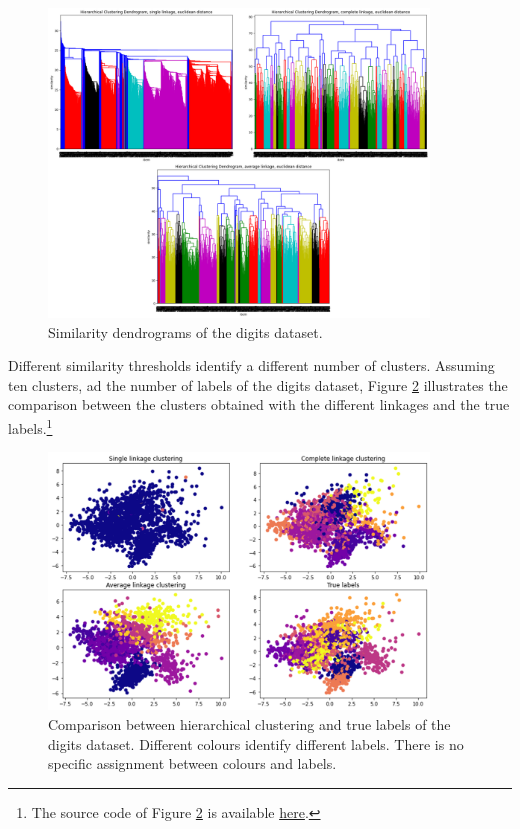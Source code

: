 \begin{figure}[hbt!]
\centering
\includegraphics[width=0.9\textwidth]{SectionLetsMath/unsupervisedLearning_figures/fig_dendrograms.png}
\captionsetup{type=figure}
\caption{Similarity dendrograms of the digits dataset.}
\label{fig_dendrograms}
\end{figure}

Different similarity thresholds identify a different number of clusters. Assuming ten clusters, ad the number of labels of the digits dataset, Figure \ref{fig_hierarchical} illustrates the comparison between the clusters obtained with the different linkages and the true labels.\footnote{The source code of Figure \ref{fig_hierarchical} is available \href{https://github.com/aletuf93/logproj/blob/master/examples/06.\%20Unsupervised\%20learning.ipynb}{here}.}

\begin{figure}[hbt!]
\centering
\includegraphics[width=0.9\textwidth]{SectionLetsMath/unsupervisedLearning_figures/fig_hierarchical.png}
\captionsetup{type=figure}
\caption{Comparison between hierarchical clustering and true labels of the digits dataset. Different colours identify different labels. There is no specific assignment between colours and labels.}
\label{fig_hierarchical}
\end{figure}

